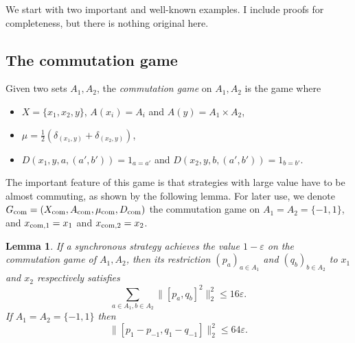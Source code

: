\documentclass[JEP,XML,SOM,Unicode,published]{cedram}
\newcommand{\com}{\textup{com}}
\theoremstyle{plain}
\newtheorem{lemma}[theorem]{Lemma}
\theoremstyle{definition}
\begin{document}
We start with two important and well-known examples. I include proofs for completeness, but there is nothing original here.

\subsection{The commutation game}
Given two sets $A_1,A_2$, the \emph{commutation game} on $A_1,A_2$ is the game where
\begin{itemize}
\item $X=\{x_1,x_2,y\}$, $A(x_i) = A_i$ and $A(y) = A_1 \times A_2$,
\item $\mu = \frac 1 2 ( \delta_{(x_1,y)}+ \delta_{(x_2,y)})$,
\item $D(x_1,y,a,(a',b')) = 1_{a=a'}$ and $D(x_2,y,b,(a',b')) = 1_{b=b'}$.
\end{itemize}
The important feature of this game is that strategies with large value have to be almost commuting, as shown by the following lemma. For later use, we denote $G_{\com}= (X_{\com},A_{\com},\mu_{\com},D_{\com})$ the commutation game on $A_1=A_2=\{-1,1\}$, and $x_{\com,1}=\nobreak x_1$ and $x_{\com,2}=x_2$.
\begin{lemma}\label{lem:commutation_game} If a synchronous strategy achieves the value $1-\varepsilon$ on the commutation game of $A_1,A_2$, then its restriction $(p_a)_{a \in A_1}$ and $(q_b)_{b \in A_2}$ to $x_1$ and $x_2$ respectively satisfies
\begin{equation}\label{eq:commutation_projection}\sum_{a\in A_1,b \in A_2} \bigl\|[p_a,q_b]^2\bigr\|_2^2 \leq 16 \varepsilon.
\end{equation}
If $A_1=A_2=\{-1,1\}$ then
\begin{equation}\label{eq:commutation_unitary} \bigl\|[p_1-p_{-1},q_1-q_{-1}]\bigr\|_2^2 \leq 64 \varepsilon.
\end{equation}
\end{lemma}
\end{document}
